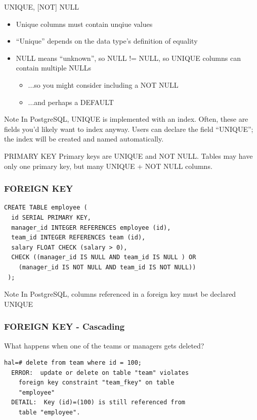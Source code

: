 \documentclass{beamer}
\begin{document}
\begin{frame}{UNIQUE, [NOT] NULL}
    \begin{itemize}
        \item Unique columns must contain unqiue values
        \item ``Unique'' depends on the data type's definition of equality
        \item NULL means ``unknown'', so NULL != NULL, so UNIQUE columns can contain multiple NULLs
        \begin{itemize}
            \item ...so you might consider including a NOT NULL
            \item ...and perhaps a DEFAULT
        \end{itemize}
    \end{itemize}
    \begin{block}{Note}
        In PostgreSQL, UNIQUE is implemented with an index. Often, these are
        fields you'd likely want to index anyway. Users can declare the field ``UNIQUE'';
        the index will be created and named automatically.
    \end{block}
\end{frame}

\begin{frame}{PRIMARY KEY}
    Primary keys are UNIQUE and NOT NULL. Tables may have only one primary key, but many UNIQUE + NOT NULL columns.
\end{frame}

\begin{frame}[fragile]
    \frametitle{FOREIGN KEY}
    \begin{Verbatim}[fontfamily=courier]
CREATE TABLE employee (
  id SERIAL PRIMARY KEY,
  manager_id INTEGER REFERENCES employee (id),
  team_id INTEGER REFERENCES team (id),
  salary FLOAT CHECK (salary > 0),
  CHECK ((manager_id IS NULL AND team_id IS NULL ) OR
    (manager_id IS NOT NULL AND team_id IS NOT NULL))
 );
    \end{Verbatim}
    \begin{block}{Note} In PostgreSQL, columns referenced in a foreign key must be declared UNIQUE
    \end{block}
\end{frame}

\begin{frame}[fragile]
    \frametitle{FOREIGN KEY - Cascading}
    What happens when one of the teams or managers gets deleted?
    \begin{Verbatim}[fontfamily=courier]
  hal=# delete from team where id = 100;
  ERROR:  update or delete on table "team" violates
    foreign key constraint "team_fkey" on table
    "employee"
  DETAIL:  Key (id)=(100) is still referenced from
    table "employee".
    \end{Verbatim}
\end{frame}
\end{document}
